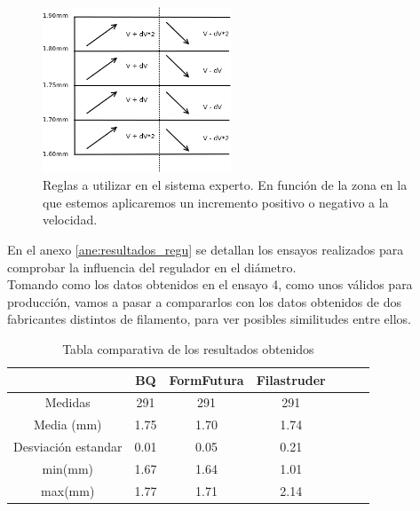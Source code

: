 \begin{figure}[H]
    \centering
    \includegraphics[width=0.5\textwidth]{images/producciones/11082015/Diagram1.png}
    \caption[Reglas a utilizar en el sistema experto.]{Reglas a utilizar en el sistema experto. En función de la zona en la que estemos aplicaremos un incremento positivo o negativo a la velocidad.}
    \label{fig:reg_reglas}
\end{figure}

En el anexo \ref{ane:resultados_regu} se detallan los ensayos realizados para comprobar la influencia del regulador en el diámetro.\\

Tomando como los datos obtenidos en el ensayo 4, como unos válidos para producción, vamos a pasar a compararlos con los datos obtenidos de dos fabricantes distintos de filamento, para ver posibles similitudes entre ellos.

\begin{table}[H]
	\centering
	\begin{tabular}{ccccccc}
		                    & BQ & FormFutura & Filastruder \\ \hline
		Medidas             & 291     &291    & 291      \\
		Media (mm)          & 1.75     & 1.70     & 1.74      \\
		Desviación estandar & 0.01     & 0.05     & 0.21      \\
		min(mm)             & 1.67     & 1.64     & 1.01      \\
		max(mm)             & 1.77     & 1.71     & 2.14     
	\end{tabular}
	\caption{Tabla comparativa de los resultados obtenidos}
	\label{tab:compara_results}
\end{table}

